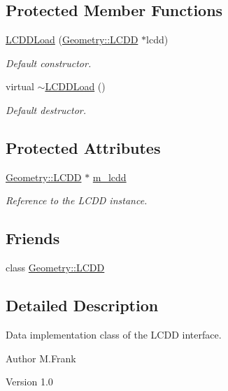 \subsection*{Protected Member Functions}
\begin{DoxyCompactItemize}
\item 
\hyperlink{class_d_d4hep_1_1_l_c_d_d_load_a684443cb47baee03eb18960afe55458a}{LCDDLoad} (\hyperlink{class_d_d4hep_1_1_geometry_1_1_l_c_d_d}{Geometry::LCDD} $\ast$lcdd)
\begin{DoxyCompactList}\small\item\em Default constructor. \item\end{DoxyCompactList}\item 
virtual \hyperlink{class_d_d4hep_1_1_l_c_d_d_load_a8eef72df9f1cf96011f88c000690f326}{$\sim$LCDDLoad} ()
\begin{DoxyCompactList}\small\item\em Default destructor. \item\end{DoxyCompactList}\end{DoxyCompactItemize}
\subsection*{Protected Attributes}
\begin{DoxyCompactItemize}
\item 
\hyperlink{class_d_d4hep_1_1_geometry_1_1_l_c_d_d}{Geometry::LCDD} $\ast$ \hyperlink{class_d_d4hep_1_1_l_c_d_d_load_a6420b6f11b8ee02144ef00bbeda63737}{m\_\-lcdd}
\begin{DoxyCompactList}\small\item\em Reference to the LCDD instance. \item\end{DoxyCompactList}\end{DoxyCompactItemize}
\subsection*{Friends}
\begin{DoxyCompactItemize}
\item 
class \hyperlink{class_d_d4hep_1_1_l_c_d_d_load_a6ad008feefc2e21d2190b244a0c96961}{Geometry::LCDD}
\end{DoxyCompactItemize}


\subsection{Detailed Description}
Data implementation class of the LCDD interface. \begin{DoxyAuthor}{Author}
M.Frank 
\end{DoxyAuthor}
\begin{DoxyVersion}{Version}
1.0 
\end{DoxyVersion}



